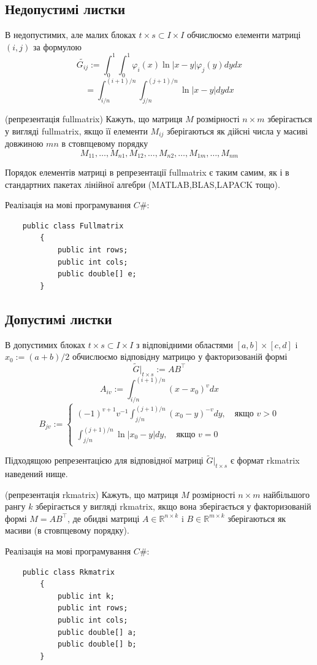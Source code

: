 \documentclass[12pt]{report}
\begin{document}
	\subsection{Недопустимі листки}
	\hspace{0.8cm} В недопустимих, але малих блоках $t\times s\subset I\times I$ обчислюємо елементи матриці $(i,j)$ за формулою
	$$\tilde{G_{ij}}:=\int_{0}^{1}\int_{0}^{1}\varphi_i(x)\ln|x-y|\varphi_j(y)dydx$$$$=\int_{i/n}^{(i+1)/n}\int_{j/n}^{(j+1)/n}\ln|x-y|dydx$$
	\begin{Def}
		(репрезентація fullmatrix) Кажуть, що матриця $M$ розмірності $n\times m$ зберігається у вигляді fullmatrix, якщо її елементи $M_{ij}$ зберігаються як дійсні числа у масиві довжиною $mn$ в стовпцевому порядку
		$$M_{11},\dots,M_{n1},M_{12},\dots,M_{n2},\dots,M_{1m},\dots,M_{nm}$$
	\end{Def}
	\par Порядок елементів матриці в репрезентації fullmatrix є таким самим, як і в стандартних пакетах лінійної алгебри (MATLAB,BLAS,LAPACK тощо).
	\par Реалізація на мові програмування $C\#$:
	\begin{verbatim}
	public class Fullmatrix
	    {
	        public int rows;
	        public int cols;
	        public double[] e;
	    }
	\end{verbatim}
	\subsection{Допустимі листки}
	\hspace{0.8cm} В допустимих блоках $t\times s\subset I\times I$ з відповідними областями $[a,b]\times [c,d]$ i $x_0:=(a+b)/2$ обчислюємо відповідну матрицю у факторизованій формі
	$$\tilde{G}|_{t\times s}:=AB^\top$$
	$$A_{iv}:=\int_{i/n}^{(i+1)/n}(x-x_0)^vdx$$
	\begin{equation*}
		B_{jv}:=\begin{cases}
					(-1)^{v+1}v^{-1}\int_{j/n}^{(j+1)/n}(x_0-y)^{-v}dy,\quad\text{якщо $v>0$}\\
					\int_{j/n}^{(j+1)/n}\ln|x_0-y|dy,\quad\text{якщо $v=0$}
				\end{cases}
	\end{equation*}
	\par Підходящою репрезентацією для відповідної матриці $\tilde{G}|_{t\times s}$ є формат rkmatrix наведений нище.
	\begin{Def}
		(репрезентація rkmatrix)  Кажуть, що матриця $M$ розмірності $n\times m$ найбільшого рангу $k$ зберігається у вигляді rkmatrix, якщо вона зберігається у факторизованій формі $M=AB^\top$, де обидві матриці $A\in\mathbb{R}^{n\times k}$ i $B\in \mathbb{R}^{m\times k}$ зберігаються як масиви (в стовпцевому порядку).
	\end{Def}
	\par Реалізація на мові програмування $C\#$:
	\begin{verbatim}
	public class Rkmatrix
	    {
	        public int k;
	        public int rows;
	        public int cols;
	        public double[] a;
	        public double[] b;
	    }
	\end{verbatim}
\end{document}
